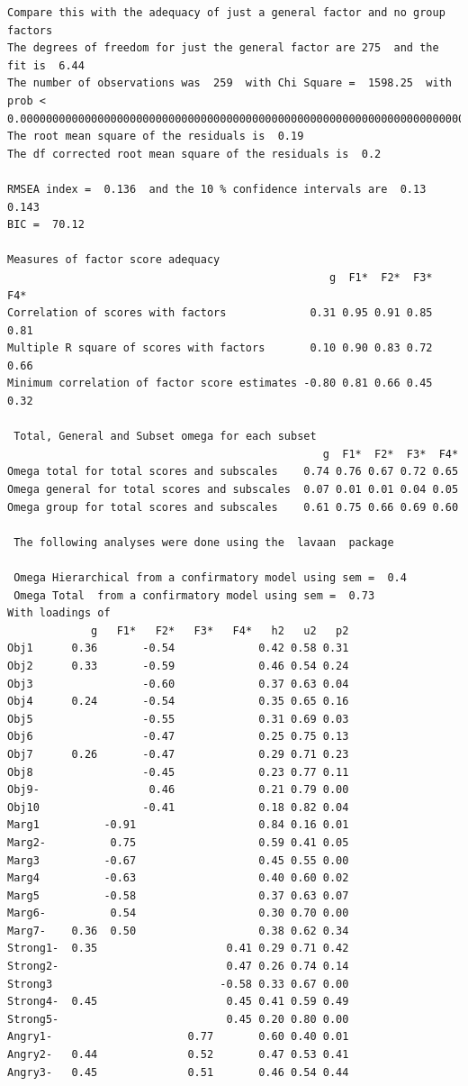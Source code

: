 \documentclass[
  english,
]{book}
\begin{document}
\begin{verbatim}
Compare this with the adequacy of just a general factor and no group factors
The degrees of freedom for just the general factor are 275  and the fit is  6.44 
The number of observations was  259  with Chi Square =  1598.25  with prob <  0.00000000000000000000000000000000000000000000000000000000000000000000000000000000000000000000000000000000000000000000000000000000000000000000000000000000000000000000000000000000000000004
The root mean square of the residuals is  0.19 
The df corrected root mean square of the residuals is  0.2 

RMSEA index =  0.136  and the 10 % confidence intervals are  0.13 0.143
BIC =  70.12 

Measures of factor score adequacy             
                                                  g  F1*  F2*  F3*  F4*
Correlation of scores with factors             0.31 0.95 0.91 0.85 0.81
Multiple R square of scores with factors       0.10 0.90 0.83 0.72 0.66
Minimum correlation of factor score estimates -0.80 0.81 0.66 0.45 0.32

 Total, General and Subset omega for each subset
                                                 g  F1*  F2*  F3*  F4*
Omega total for total scores and subscales    0.74 0.76 0.67 0.72 0.65
Omega general for total scores and subscales  0.07 0.01 0.01 0.04 0.05
Omega group for total scores and subscales    0.61 0.75 0.66 0.69 0.60

 The following analyses were done using the  lavaan  package 

 Omega Hierarchical from a confirmatory model using sem =  0.4
 Omega Total  from a confirmatory model using sem =  0.73 
With loadings of 
             g   F1*   F2*   F3*   F4*   h2   u2   p2
Obj1      0.36       -0.54             0.42 0.58 0.31
Obj2      0.33       -0.59             0.46 0.54 0.24
Obj3                 -0.60             0.37 0.63 0.04
Obj4      0.24       -0.54             0.35 0.65 0.16
Obj5                 -0.55             0.31 0.69 0.03
Obj6                 -0.47             0.25 0.75 0.13
Obj7      0.26       -0.47             0.29 0.71 0.23
Obj8                 -0.45             0.23 0.77 0.11
Obj9-                 0.46             0.21 0.79 0.00
Obj10                -0.41             0.18 0.82 0.04
Marg1          -0.91                   0.84 0.16 0.01
Marg2-          0.75                   0.59 0.41 0.05
Marg3          -0.67                   0.45 0.55 0.00
Marg4          -0.63                   0.40 0.60 0.02
Marg5          -0.58                   0.37 0.63 0.07
Marg6-          0.54                   0.30 0.70 0.00
Marg7-    0.36  0.50                   0.38 0.62 0.34
Strong1-  0.35                    0.41 0.29 0.71 0.42
Strong2-                          0.47 0.26 0.74 0.14
Strong3                          -0.58 0.33 0.67 0.00
Strong4-  0.45                    0.45 0.41 0.59 0.49
Strong5-                          0.45 0.20 0.80 0.00
Angry1-                     0.77       0.60 0.40 0.01
Angry2-   0.44              0.52       0.47 0.53 0.41
Angry3-   0.45              0.51       0.46 0.54 0.44


\end{verbatim}
\end{document}
